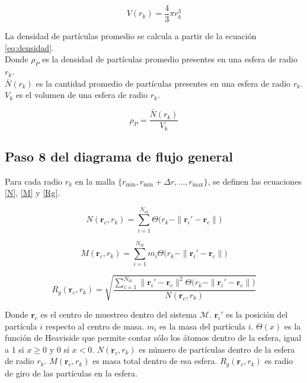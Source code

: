 	 
	 \begin{equation}
	 	V(r_k) = \frac{4}{3} \pi r_{k}^{3}
	 	\label{volumen}
	 \end{equation}
	 
	 La densidad de part\'{i}culas promedio se calcula a partir de la ecuaci\'{o}n \ref{eq:densidad}. \\
	 Donde \(\rho_{P}\) es la densidad de part\'{i}culas promedio presentes en una esfera de radio \(r_k\).\\
	 \(\bar N(r_{k})\) es la cantidad promedio de part\'{i}culas presentes en una esfera de radio \(r_k\).
	 \(V_{k}\) es el volumen de una esfera de radio \(r_{k}\).
	 
	 \begin{equation}
	 	\rho_P = \frac{\bar N(r_{k})}{V_{k}}
	 	\label{eq:densidad}
	 \end{equation}
	 

	\subsection{Paso 8 del diagrama de flujo general}

	Para cada radio $r_k$ en la malla $\{r_{\text{min}}, r_{\text{min}} + \Delta r, \ldots, r_{\text{max}}\}$, se definen las ecuaciones \ref{N}, \ref{M} y \ref{Rg}.
	
	\begin{equation}
		N(\mathbf{r}_c, r_k) = \sum_{i=1}^{N_{\text{at}}} 
		\Theta\!\bigl(r_k - \|\mathbf{r}_i' - \mathbf{r}_c\|\bigr)
		\label{N}
	\end{equation}
	
	\begin{equation}
		M(\mathbf{r}_c, r_k) = \sum_{i=1}^{N_{\text{at}}} 
		m_i \Theta\!\bigl(r_k - \|\mathbf{r}_i' - \mathbf{r}_c\|\bigr)
		\label{M}
	\end{equation}
	
	\begin{equation}
		R_g(\mathbf{r}_c, r_k) = 
		\sqrt{\frac{\displaystyle\sum_{i=1}^{N_{\text{at}}} 
				\|\mathbf{r}_i' - \mathbf{r}_c\|^2  
				\Theta\!\bigl(r_k - \|\mathbf{r}_i' - \mathbf{r}_c\|\bigr)}
			{N(\mathbf{r}_c, r_k)}}
		\label{Rg}
	\end{equation}
	
	Donde $\mathbf{r}_c$ es el centro de muestreo dentro del sistema $\mathcal{M}$.
	$\mathbf{r}_i'$ es la posición del partícula $i$ respecto al centro de masa. 
	$m_i$ es la masa del partícula $i$. $\Theta(x)$ es la función de Heaviside que permite contar sólo los átomos dentro de la esfera, igual a $1$ si $x \ge 0$ y $0$ si $x < 0$. $N(\mathbf{r}_c, r_k)$ es número de partículas dentro de la esfera de radio $r_k$. $M(\mathbf{r}_c, r_k)$ es masa total dentro de esa esfera. 
	$R_g(\mathbf{r}_c, r_k)$ es radio de giro de las partículas en la esfera.
	
